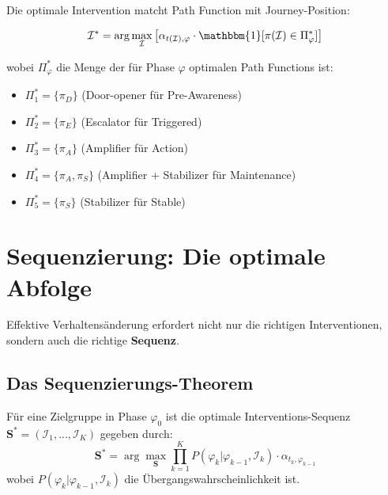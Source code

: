 Die optimale Intervention matcht Path Function mit Journey-Position:

\begin{equation}
\mathcal{I}^* = \arg\max_{\mathcal{I}} \left[ \alpha_{t(\mathcal{I}), \varphi} \cdot \mathbbm{1}[\pi(\mathcal{I}) \in \Pi^*_\varphi] \right]
\label{eq:18-path-matching}
\end{equation}

wobei $\Pi^*_\varphi$ die Menge der für Phase $\varphi$ optimalen Path Functions ist:
\begin{itemize}
\item $\Pi^*_1 = \{\pi_D\}$ (Door-opener für Pre-Awareness)
\item $\Pi^*_2 = \{\pi_E\}$ (Escalator für Triggered)
\item $\Pi^*_3 = \{\pi_A\}$ (Amplifier für Action)
\item $\Pi^*_4 = \{\pi_A, \pi_S\}$ (Amplifier + Stabilizer für Maintenance)
\item $\Pi^*_5 = \{\pi_S\}$ (Stabilizer für Stable)
\end{itemize}


\section{Sequenzierung: Die optimale Abfolge}
\label{sec:18-sequence}

Effektive Verhaltensänderung erfordert nicht nur die richtigen Interventionen, sondern auch die richtige \textbf{Sequenz}.

\subsection{Das Sequenzierungs-Theorem}

\begin{theorem}
\label{thm:18-sequence}
Für eine Zielgruppe in Phase $\varphi_0$ ist die optimale Interventions-Sequenz $\mathbf{S}^* = (\mathcal{I}_1, ..., \mathcal{I}_K)$ gegeben durch:
\begin{equation}
\mathbf{S}^* = \arg\max_{\mathbf{S}} \prod_{k=1}^{K} P(\varphi_{k} | \varphi_{k-1}, \mathcal{I}_k) \cdot \alpha_{t_k, \varphi_{k-1}}
\label{eq:18-optimal-sequence}
\end{equation}
wobei $P(\varphi_{k} | \varphi_{k-1}, \mathcal{I}_k)$ die Übergangswahrscheinlichkeit ist.
\end{theorem}

